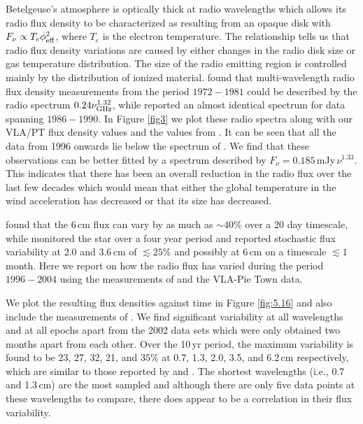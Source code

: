 \documentclass[iop]{emulateapj}
\begin{document}
Betelgeuse's atmosphere is optically thick at radio wavelengths which allows its radio flux density to be characterized as resulting from an opaque disk with $F_{\nu} \propto T_{e}\phi _{\rm{eff}}^2$, where $T_{e}$ is the electron temperature. The relationship tells us that radio flux density variations are caused by either changes in the radio disk size or gas temperature distribution. The size of the radio emitting region is controlled mainly by the distribution of ionized material. \cite{newell_1982} found that multi-wavelength radio flux density measurements from the period $1972-1981$ could be described by the radio spectrum $0.24\nu ^{1.32}_{\rm{GHz}}$, while \cite{drake_1992} reported an almost identical spectrum for data spanning $1986-1990$.  In Figure \ref{fig3} we plot these radio spectra along with our VLA/PT flux density values and the values from \cite{lim_1998}. It can be seen that all the data from 1996 onwards lie below the spectrum of \cite{newell_1982}. We find that these observations can be better fitted by a spectrum described by $F_{\nu} = 0.185$\,mJy\,$\nu ^{1.33}$. This indicates that there has been an overall reduction in the radio flux over the last few decades which would mean that either the global temperature in the wind acceleration has decreased or that its size has decreased.

\cite{bookbinder_1987} found that the 6\,cm flux can vary by as much as $\sim 40\%$ over a 20 day timescale, while \cite{drake_1992} monitored the star over a four year period and reported stochastic flux variability at 2.0 and 3.6\,cm of $\lesssim 25\%$ and possibly at 6\,cm on a timescale $\lesssim 1$ month. Here we report on how the radio flux has varied during the period $1996-2004$ using the measurements of \cite{lim_1998} and the VLA-Pie Town data.

We plot the resulting flux densities against time in Figure \ref{fig:5.16} and also include the measurements of \cite{lim_1998}. We find significant variability at all wavelengths and at all epochs apart from the 2002 data sets which were only obtained two months apart from each other. Over the 10\,yr period, the maximum variability is found to be 23, 27, 32, 21, and $35\%$ at 0.7, 1.3, 2.0, 3.5, and 6.2\,cm respectively, which are similar to those reported by \cite{drake_1992} and \cite{bookbinder_1987}. The shortest wavelengths (i.e., 0.7 and 1.3\,cm) are the most sampled and although there are only five data points at these wavelengths to compare, there does appear to be a correlation in their flux variability.
\end{document}
